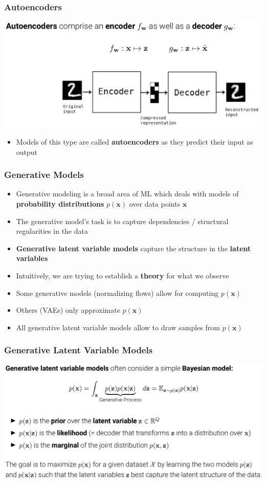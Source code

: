 \documentclass[10pt,aspectratio=169]{beamer}
\begin{document}
\begin{frame}
  \frametitle{Autoencoders}
\begin{center}
\includegraphics[width=.9\textwidth]{images/s4}
\end{center}
\begin{itemize}
\item Models of this type are called \textbf{autoencoders} as they predict their input as output
\end{itemize}
\end{frame}



\begin{frame}
  \frametitle{Generative Models}
\small{
\begin{itemize}[<+->]
\item Generative modeling is a broad area of ML which deals with models of 
\textbf{probability distributions} $p(\mathbf{x})$ over data points $\mathbf{x}$
\item The generative model's task is to capture dependencies / structural regularities in the data
\item \textbf{Generative latent variable models} capture the structure in the \textbf{latent variables}
\item Intuitively, we are trying to establish a \textbf{theory} for what we observe
\item Some generative models (normalizing flows) allow for computing $p(\mathbf{x})$
\item Others (VAEs) only approximate $p(\mathbf{x})$
\item All generative latent variable models allow to draw samples from $p(\mathbf{x})$
\end{itemize}

}
\end{frame}


\begin{frame}
  \frametitle{Generative Latent Variable Models}
\begin{center}
\includegraphics[width=.9\textwidth]{images/s5}
\end{center}
\end{frame}
\end{document}
